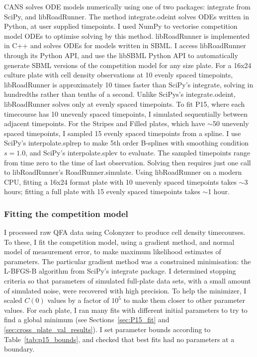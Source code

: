 CANS solves ODE models numerically using one of two packages:
integrate from SciPy, and libRoadRunner. The method integrate.odeint
solves ODEs written in Python, at user supplied timepoints. I used
NumPy to vectorise competition model ODEs to optimise solving by this
method. libRoadRunner is implemented in C++ and solves ODEs for models
written in SBML. I access libRoadRunner through its Python API, and
use the libSBML Python API to automatically generate SBML versions of
the competition model for any size plate. For a 16x24 culture plate
with cell density observations at 10 evenly spaced timepoints,
libRoadRunner is approximately 10 times faster than SciPy's integrate,
solving in hundredths rather than tenths of a second. Unlike SciPys's
integrate.odeint, libRoadRunner solves only at evenly spaced
timepoints. To fit P15, where each timecourse has 10 unevenly spaced
timepoints, I simulated sequentially between adjacent timepoints. For
the Stripes and Filled plates, which have \(\sim\)50 unevenly spaced
timepoints, I sampled 15 evenly spaced timepoints from a spline. I use
SciPy's interpolate.splrep to make 5th order B-splines with smoothing
condition \(s=1.0\), and SciPy's interpolate.splev to evaluate. The
sampled timepoints range from time zero to the time of last
observation. Solving then requires just one call to libRoadRunner's
RoadRunner.simulate. Using libRoadRunner on a modern CPU, fitting a
16x24 format plate with 10 unevenly spaced timepoints takes \(\sim\)3
hours; fitting a full plate with 15 evenly spaced timepoints takes
\(\sim\)1 hour.

\subsubsection{Fitting the competition model}
\label{sec:fitting_comp}


I processed raw QFA data using Colonyzer \citep{Lawless2010} to
produce cell density timecourses.
To these, I fit the competition model, using a gradient method, and
normal model of measurement error, to make maximum likelihood
estimates of parameters. The particular gradient method was a
constrained minimisation: the L-BFGS-B algorithm from SciPy's
integrate package. I determined stopping criteria so that parameters
of simulated full-plate data sets, with a small amount of simulated
noise, were recovered with high precision. To help the minimizer, I
scaled \(C(0)\) values by a factor of \(10^{5}\) to make them closer
to other parameter values. For each plate, I ran many fits with
different initial parameters to try to find a global minimum (see
Sections~\ref{sec:P15_fit} and \ref{sec:cross_plate_val_results}). I
set parameter bounds according to Table~\ref{tab:p15_bounds}, and
checked that best fits had no parameters at a boundary.

